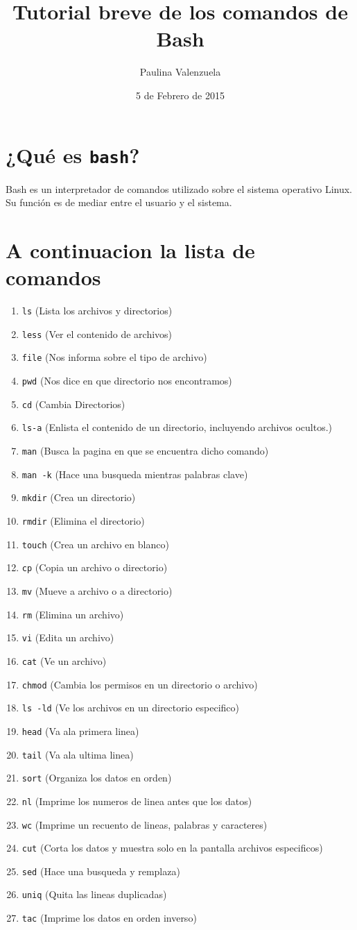 \documentclass[12pt]{article}
\title{Tutorial breve de los comandos de Bash}
\author{Paulina Valenzuela}
\date{5 de Febrero de 2015}
\begin{document}
\maketitle
\section{¿Qué es {\tt bash}?}
Bash es un interpretador de comandos utilizado sobre el sistema operativo Linux.
Su función es de mediar entre el usuario y el sistema.
\section{A continuacion la lista de comandos}
\begin{enumerate}
\item {\tt ls} (Lista los archivos y directorios)
\item {\tt less} (Ver el contenido de archivos)
\item {\tt file} (Nos informa sobre el tipo de archivo)
\item {\tt pwd} (Nos dice en que directorio nos encontramos)
\item {\tt cd} (Cambia Directorios)
\item {\tt ls-a} (Enlista el contenido de un directorio, incluyendo archivos ocultos.)
\item {\tt man} (Busca la pagina en que se encuentra dicho comando)
\item {\tt man -k} (Hace una busqueda mientras palabras clave)
\item {\tt mkdir} (Crea un directorio)
\item {\tt rmdir} (Elimina el directorio)
\item {\tt touch} (Crea un archivo en blanco)
\item {\tt cp} (Copia un archivo o directorio)
\item {\tt mv} (Mueve a archivo o a directorio)
\item {\tt rm} (Elimina un archivo)
\item {\tt vi} (Edita un archivo)
\item {\tt cat} (Ve un archivo)
\item {\tt chmod} (Cambia los permisos en un directorio o archivo)
\item {\tt ls -ld} (Ve los archivos en un directorio especifico)
\item {\tt head} (Va ala primera linea)
\item {\tt tail} (Va ala ultima linea)
\item {\tt sort} (Organiza los datos en orden)
\item {\tt nl} (Imprime los numeros de linea antes que los datos)
\item {\tt wc} (Imprime un recuento de lineas, palabras y caracteres)
\item {\tt cut} (Corta los datos y muestra solo en la pantalla archivos especificos)
\item {\tt sed} (Hace una busqueda y remplaza)
\item {\tt uniq} (Quita las lineas duplicadas)
\item {\tt tac} (Imprime los datos en orden inverso)
\end{enumerate}

\end{document}
